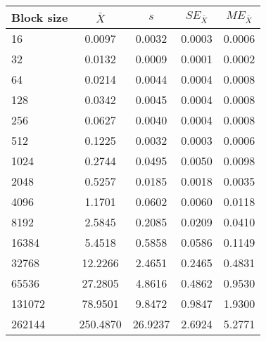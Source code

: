 \begin{tabular}{lcccc}\toprule
{\small Block size} & $\bar{X}$ & $s$ & $SE_{\bar{X}}$ & $ME_{\bar{X}}$ \\\midrule
16 & 0.0097 & 0.0032 & 0.0003 & 0.0006\\
32 & 0.0132 & 0.0009 & 0.0001 & 0.0002\\
64 & 0.0214 & 0.0044 & 0.0004 & 0.0008\\
128 & 0.0342 & 0.0045 & 0.0004 & 0.0008\\
256 & 0.0627 & 0.0040 & 0.0004 & 0.0008\\
512 & 0.1225 & 0.0032 & 0.0003 & 0.0006\\
1024 & 0.2744 & 0.0495 & 0.0050 & 0.0098\\
2048 & 0.5257 & 0.0185 & 0.0018 & 0.0035\\
4096 & 1.1701 & 0.0602 & 0.0060 & 0.0118\\
8192 & 2.5845 & 0.2085 & 0.0209 & 0.0410\\
16384 & 5.4518 & 0.5858 & 0.0586 & 0.1149\\
32768 & 12.2266 & 2.4651 & 0.2465 & 0.4831\\
65536 & 27.2805 & 4.8616 & 0.4862 & 0.9530\\
131072 & 78.9501 & 9.8472 & 0.9847 & 1.9300\\
262144 & 250.4870 & 26.9237 & 2.6924 & 5.2771\\
\bottomrule
\end{tabular}

